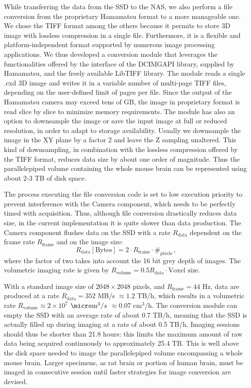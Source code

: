 \documentclass[12pt]{spieman}  %
\begin{document}
While transferring the data from the SSD to the NAS, we also perform a file conversion from the proprietary Hamamatsu format to a more manageable one. We chose the TIFF format among the others because it permits to store 3D image with lossless compression in a single file. Furthermore, it is a flexible and platform-independent format supported by numerous image processing applications. We thus developed a conversion module that leverages the functionalities offered by the interface of the DCIMGAPI library, supplied by Hamamatsu, and the freely available LibTIFF library. The module reads a single .cxd 3D image and writes it in a variable number of multi-page TIFF files, depending on the user-defined limit of pages per file. Since the output of the Hamamatsu camera may exceed tens of GB, the image in proprietary format is read slice by slice to minimize memory requirements. The module has also an option to downsample the image or save the input image at full or reduced resolution, in order to adapt to storage availability. Usually we downsample the image in the XY plane by a factor 2 and leave the Z sampling unaltered. This kind of downsampling, in combination with the lossless compression offered by the TIFF format, reduces data size by about one order of magnitude. Thus the parallelepiped volume containing the whole mouse brain can be represented using about 2-3 TB of disk space. 

The process executing the file conversion code is set to low execution priority to prevent interference with the Camera component, which needs to be perfectly timed with acquisition. Thus, although file conversion drastically reduces data size, in the current implementation it is quite slower than data production. The Camera component flushes data on the SSD with a rate $R_{\text{data}}$ dependent on the frame rate $R_{\text{frame}}$ and on the image size:
\begin{equation}
R_{\text{data}} [\text{Bytes}] = 2\cdot R_{\text{frame}} \cdot \#_{\text{pixels}}\,,
\end{equation}
where the factor of two takes into account the 16 bit grey depth of images. The volumetric imaging rate is given by $R_{\text{volume}} = 0.5 R_{\text{data}} \cdot \text{Voxel size}$.

With a standard image size of $2048\times 2048$ pixels, and $R_{\text{frame}}=44$ Hz, data are produced at a rate $R_{\text{data}}=352$ MB/s $\approx 1.2$ TB/h, which results in a volumetric rate $R_{\text{volume}} \approx 2\times 10^7$ $\micro\text{m}^3/s$ $\approx 0.07$ $\text{cm}^3$/h. The conversion module can empty the SSD with an average rate of about 0.7 TB/h, meaning that the SSD is actually filled up during imaging at a rate of about 0.5 TB/h. Imaging sessions should thus be shorter than 21.8 hours: this limits the maximum amount of raw data being acquired continuously to approximately 25.4 TB. This is well above the disk space needed to image the parallelepiped volume encompassing a whole mouse brain. Larger specimens, as rat brain or portion of human brain, must be imaged in consecutive session until faster strategies for image conversion are devised.
\end{document}
